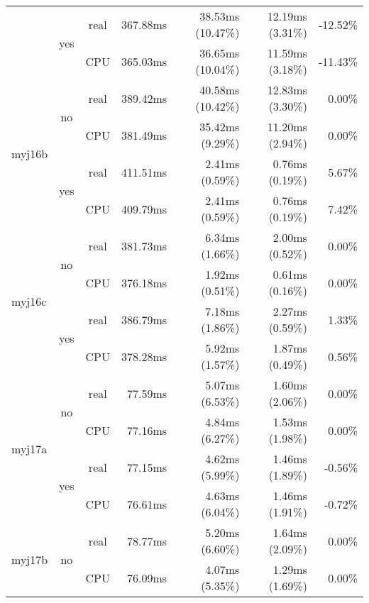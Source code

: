 \documentclass[en]{pracamgr}
\begin{document}
\begin{appendices}
\begin{small}
\begin{longtable}{|l|c|c|r|r|r|r|}
                          \cline{2-7}
                          & \multirow{2}{*}{yes} & real & 367.88ms & 38.53ms (10.47\%) & 12.19ms (3.31\%) & -12.52\% \\*
                          &                      & CPU  & 365.03ms & 36.65ms (10.04\%) & 11.59ms (3.18\%) & -11.43\% \\
\hline
\multirow{4}{*}{myj16b}   & \multirow{2}{*}{no}  & real & 389.42ms & 40.58ms (10.42\%) & 12.83ms (3.30\%) & 0.00\% \\*
                          &                      & CPU  & 381.49ms & 35.42ms (9.29\%) & 11.20ms (2.94\%) & 0.00\% \\*
                          \cline{2-7}
                          & \multirow{2}{*}{yes} & real & 411.51ms & 2.41ms (0.59\%) & 0.76ms (0.19\%) & 5.67\% \\*
                          &                      & CPU  & 409.79ms & 2.41ms (0.59\%) & 0.76ms (0.19\%) & 7.42\% \\
\hline
\multirow{4}{*}{myj16c}   & \multirow{2}{*}{no}  & real & 381.73ms & 6.34ms (1.66\%) & 2.00ms (0.52\%) & 0.00\% \\*
                          &                      & CPU  & 376.18ms & 1.92ms (0.51\%) & 0.61ms (0.16\%) & 0.00\% \\*
                          \cline{2-7}
                          & \multirow{2}{*}{yes} & real & 386.79ms & 7.18ms (1.86\%) & 2.27ms (0.59\%) & 1.33\% \\*
                          &                      & CPU  & 378.28ms & 5.92ms (1.57\%) & 1.87ms (0.49\%) & 0.56\% \\
\hline
\multirow{4}{*}{myj17a}   & \multirow{2}{*}{no}  & real & 77.59ms & 5.07ms (6.53\%) & 1.60ms (2.06\%) & 0.00\% \\*
                          &                      & CPU  & 77.16ms & 4.84ms (6.27\%) & 1.53ms (1.98\%) & 0.00\% \\*
                          \cline{2-7}
                          & \multirow{2}{*}{yes} & real & 77.15ms & 4.62ms (5.99\%) & 1.46ms (1.89\%) & -0.56\% \\*
                          &                      & CPU  & 76.61ms & 4.63ms (6.04\%) & 1.46ms (1.91\%) & -0.72\% \\
\hline
\multirow{4}{*}{myj17b}   & \multirow{2}{*}{no}  & real & 78.77ms & 5.20ms (6.60\%) & 1.64ms (2.09\%) & 0.00\% \\*
                          &                      & CPU  & 76.09ms & 4.07ms (5.35\%) & 1.29ms (1.69\%) & 0.00\% \\*

\end{longtable}
\end{small}
\end{appendices}
\end{document}
